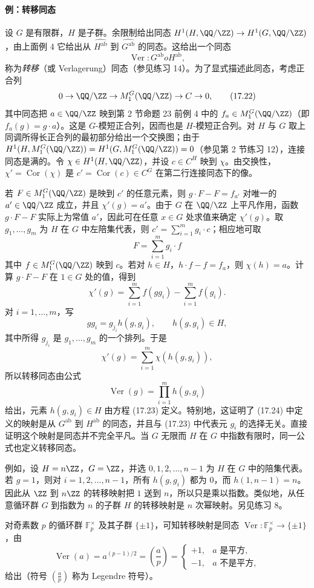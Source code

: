 \paragraph{例：转移同态}
设 $G$ 是有限群，$H$ 是子群。余限制给出同态 $H^1(H,\QQ/\ZZ)\to H^1(G,\QQ/\ZZ)$，由上面例 4 它给出从 $\widehat{H^{\mathrm{ab}}}$ 到 $\widehat{G^{\mathrm{ab}}}$ 的同态。这给出一个同态
\[
  \operatorname{Ver}:G^{\mathrm{ab}}	o H^{\mathrm{ab}},
\]
称为\emph{转移}（或 Verlagerung）同态（参见练习 14）。为了显式描述此同态，考虑正合列
\[
  0\to\QQ/\ZZ\to M_1^G(\QQ/\ZZ)\to C\to0,
  \tag{17.22}
\]
其中同态把 $a\in\QQ/\ZZ$ 映到第 2 节命题 23 前例 4 中的 $f_a\in M_1^G(\QQ/\ZZ)$（即 $f_a(g)=g\cdot a$）。这是 $G$-模短正合列，因而也是 $H$-模短正合列。对 $H$ 与 $G$ 取上同调所得长正合列的最初部分给出一个交换图；由于 $H^1(H,M_1^G(\QQ/\ZZ))=H^1(G,M_1^G(\QQ/\ZZ))=0$（参见第 2 节练习 12），连接同态是满的。令 $\chi\in H^1(H,\QQ/\ZZ)$，并设 $c\in C^H$ 映到 $\chi$。由交换性，$\chi'=\operatorname{Cor}(\chi)$ 是 $c'=\operatorname{Cor}(c)\in C^G$ 在第二行连接同态下的像。

若 $F\in M_1^G(\QQ/\ZZ)$ 是映到 $c'$ 的任意元素，则 $g\cdot F-F=f_{a'}$ 对唯一的 $a'\in\QQ/\ZZ$ 成立，并且 $\chi'(g)=a'$。由于 $G$ 在 $\QQ/\ZZ$ 上平凡作用，函数 $g\cdot F-F$ 实际上为常值 $a'$，因此可在任意 $x\in G$ 处求值来确定 $\chi'(g)$。取 $g_1,
\ldots,g_m$ 为 $H$ 在 $G$ 中左陪集代表，则 $c'=\sum_{i=1}^m g_i\cdot c$；相应地可取
\[
  F=\sum_{i=1}^m g_i\cdot f
\]
其中 $f\in M_1^G(\QQ/\ZZ)$ 映到 $c$。若对 $h\in H$，$h\cdot f-f=f_a$，则 $\chi(h)=a$。计算 $g\cdot F-F$ 在 $1\in G$ 处的值，得到
\[
  \chi'(g)=\sum_{i=1}^m f(gg_i)-\sum_{i=1}^m f(g_i).
\]
对 $i=1,
\ldots,m$，写
\[
  gg_i=g_{j_i}h(g,g_i),
  \qquad h(g,g_i)
\in H,
  \tag{17.23}
\]
其中所得 $g_{j_i}$ 是 $g_1,
\ldots,g_m$ 的一个排列。于是
\[
  \chi'(g)=\sum_{i=1}^m \chi(h(g,g_i)),
\]
所以转移同态由公式
\[
  \operatorname{Ver}(g)=\prod_{i=1}^m h(g,g_i)
  \tag{17.24}
\]
给出，元素 $h(g,g_i)\in H$ 由方程 (17.23) 定义。特别地，这证明了 (17.24) 中定义的映射是从 $G^{\mathrm{ab}}$ 到 $H^{\mathrm{ab}}$ 的同态，并且与 (17.23) 中代表元 $g_i$ 的选择无关。直接证明这个映射是同态并不完全平凡。当 $G$ 无限而 $H$ 在 $G$ 中指数有限时，同一公式也定义转移同态。

例如，设 $H=n\ZZ$，$G=\ZZ$，并选 $0,1,2,
\ldots,n-1$ 为 $H$ 在 $G$ 中的陪集代表。若 $g=1$，则对 $i=1,2,
\ldots,n-1$，所有 $h(g,g_i)$ 都为 $0$，而 $h(1,n-1)=n$。因此从 $\ZZ$ 到 $n\ZZ$ 的转移映射把 $1$ 送到 $n$，所以只是乘以指数。类似地，从任意循环群 $G$ 到指数为 $n$ 的子群 $H$ 的转移映射是 $n$ 次幂映射。另见练习 8。

对奇素数 $p$ 的循环群 $\mathbb F_p^\times$ 及其子群 $\{\pm1\}$，可知转移映射是同态 $\operatorname{Ver}:\mathbb F_p^\times\to\{\pm1\}$，由
\[
  \operatorname{Ver}(a)=a^{(p-1)/2}=\left(\frac ap\right)=
  \begin{cases}
  +1,& a\text{ 是平方},\\
  -1,& a\text{ 不是平方},
  \end{cases}
\]
给出（符号 $\left(\frac ap\right)$ 称为 Legendre 符号）。


